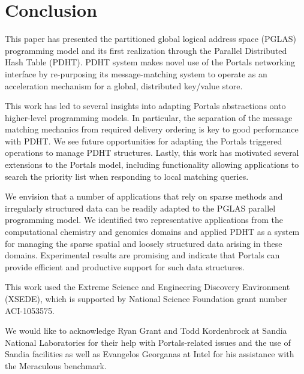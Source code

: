 \section{Conclusion}

This paper has presented the partitioned global logical address space (PGLAS)
programming model and its first realization through the Parallel Distributed
Hash Table (PDHT).  PDHT system makes novel use of the Portals networking
interface by re-purposing its message-matching system to operate as an
acceleration mechanism for a global, distributed key/value store.

This work has led to several insights into adapting Portals abstractions onto
higher-level programming models. In particular, the separation of the message
matching mechanics from required delivery ordering is key to good
performance with PDHT. We see future opportunities for adapting the Portals
triggered operations to manage PDHT structures. Lastly, this work has motivated
several extensions to the Portals model, including functionality allowing
applications to search the priority list when responding to local matching
queries.

We envision that a number of applications that rely on sparse methods and
irregularly structured data can be readily adapted to the PGLAS parallel
programming model.  We identified two representative applications from the
computational chemistry and genomics domains and applied PDHT as a system for
managing the sparse spatial and loosely structured data arising in these
domains.  Experimental results are promising and indicate that Portals can
provide efficient and productive support for such data structures.

\begin{acks}
This work used the Extreme Science and Engineering Discovery Environment
(XSEDE), which is supported by National Science Foundation grant number
ACI-1053575.

We would like to acknowledge Ryan Grant and Todd Kordenbrock at Sandia
National Laboratories for their help with Portals-related issues and the
use of Sandia facilities as well as Evangelos Georganas at
Intel for his assistance with the Meraculous benchmark.
\end{acks}
\vspace{-3mm}
